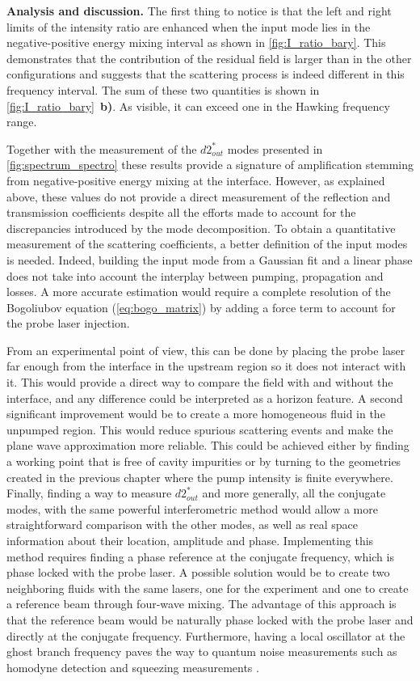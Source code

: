 \bigskip

\textbf{Analysis and discussion.} The first thing to notice is that the left and right limits of the intensity ratio are enhanced when the input mode lies in the negative-positive energy mixing interval as shown in \autoref{fig:I_ratio_bary}. This demonstrates that the contribution of the residual field is larger than in the other configurations and suggests that the scattering process is indeed different in this frequency interval. The sum of these two quantities is shown in \autoref{fig:I_ratio_bary}~\textbf{b)}. As visible,
it can exceed one in the Hawking frequency range.

Together with the measurement of the $d2^*_{out}$ modes presented in \autoref{fig:spectrum_spectro} these results provide a signature of amplification stemming from negative-positive energy mixing at the interface. However, as explained above, these values do not provide a direct measurement of the reflection and transmission coefficients despite all the efforts made to account for the discrepancies introduced by the mode decomposition.
To obtain a quantitative measurement of the scattering coefficients, a better definition of the input modes is needed. Indeed, building the input mode from a Gaussian fit and a linear phase does not take into account the interplay between pumping, propagation and losses. A more accurate estimation would require a complete resolution of the Bogoliubov equation (\ref{eq:bogo_matrix}) by adding a force term to account for the probe laser injection. 

From an experimental point of view, this can be done by placing the probe laser far enough from the interface in the upstream region so it does not interact with it. This would provide
a direct way to compare the field with and without the interface, and any difference could be interpreted as a horizon feature. A second significant 
improvement would be to create a more homogeneous fluid in the unpumped region. This would reduce spurious scattering events and make the plane wave approximation more reliable.
This could be achieved either by finding a working point that is free of cavity impurities or by turning to the geometries created in the previous chapter where the pump intensity is finite everywhere.
Finally, finding a way to measure $d2_{out}^*$ and more generally, all the conjugate modes, with the same powerful interferometric method would allow a more straightforward comparison with the other modes, as well as real space information about their location, amplitude and phase. Implementing this method requires finding a phase reference at the conjugate frequency, which is phase locked with the probe laser. A possible solution would be to create two neighboring fluids with the same lasers, one for the experiment and one to create a reference beam through four-wave mixing. The advantage of this approach is that the reference beam would be naturally phase locked with the probe laser and directly at the conjugate frequency.
Furthermore, having a local oscillator at the ghost branch frequency paves the way to quantum noise measurements such as homodyne detection and squeezing measurements \cite{agullo_symplectic_2022}.



